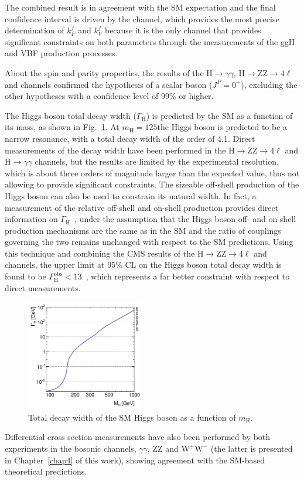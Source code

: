 The combined result is in agreement with the SM expectation and the final confidence interval is driven by the \hww channel, which provides the most precise determination of $k_F^f$ and $k_V^f$ because it is the only channel that provides significant constraints on both parameters through the measurements of the ggH and VBF production processes.

About the spin and parity properties, the results of the H$\to \gamma\gamma$, H$\to$ZZ$\to 4\ell$ and \hwwllnn channels confirmed the hypothesis of a scalar boson ($J^P = 0^+$), excluding the other hypotheses with a confidence level of 99\% or higher.

The Higgs boson total decay width ($\Gamma_\mathrm{H}$) is predicted by the SM as a function of its mass, as shown in Fig.~\ref{fig:width}. At $m_\mathrm{H}=125$\GeV the Higgs boson is predicted to be a narrow resonance, with a total decay width of the order of 4.1\MeV. Direct measurements of the decay width have been performed in the H$\to$ZZ$\to 4\ell$ and H$\to\gamma\gamma$ channels, but the results are limited by the experimental resolution, which is about three orders of magnitude larger than the expected value, thus not allowing to provide significant constraints. The sizeable off-shell production of the Higgs boson can also be used to constrain its natural width. In fact, a measurement of the relative off-shell and on-shell production provides direct information on $\Gamma_\mathrm{H}$~\cite{Caola:2013yja}, under the assumption that the Higgs boson off- and on-shell production mechanisms are the same as in the SM and the ratio of couplings governing the two remains unchanged with respect to the SM predictions. Using this technique and combining the CMS results of the H$\to$ZZ$\to 4\ell$ and \hwwllnn channels, the upper limit at 95\% CL on the Higgs boson total decay width is found to be $\Gamma_\mathrm{H}^\mathrm{obs} < 13$\MeV~\cite{Khachatryan:2016ctc}, which represents a far better constraint with respect to direct measurements.

\begin{figure}[htb]
\centering
\includegraphics[width=0.45\textwidth]{images/width.pdf}
\caption{Total decay width of the SM Higgs boson as a function of $m_\mathrm{H}$.}\label{fig:width}
\end{figure}

Differential cross section measurements have also been performed by both experiments in the bosonic channels, $\gamma\gamma$, ZZ and $\mathrm{W^+W^-}$ (the latter is presented in Chapter~\ref{chap4} of this work), showing agreement with the SM-based theoretical predictions.
